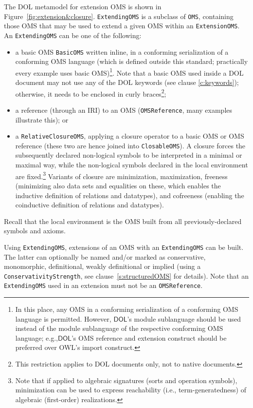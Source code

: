 \documentclass[10pt, a4paper]{isov2}
\makeatletter
\newcommand*{\eg}{e.g.,\@\xspace}
\newcommand*{\syntax}[1]{\texttt{#1}}
\newcommand*{\DOL}{\ensuremath{\mathsf{DOL}}\xspace}
\makeatother
\begin{document}
The DOL metamodel for extension OMS is shown in Figure~\ref{fig:extension&closure}.
\syntax{ExtendingOMS} is a subclass of \syntax{OMS}, containing
those OMS that may be used to extend a given OMS within an \syntax{ExtensionOMS}.
An \syntax{ExtendingOMS} can be one of the following:
\begin{itemize}
\item a basic OMS \syntax{BasicOMS} written inline, in a conforming serialization of a conforming OMS
language (which is defined outside this standard; practically every example uses basic OMS)\footnote{In this place, any OMS in a conforming serialization of a conforming OMS language is permitted.
However, \DOL's module sublanguage should be used instead of the module sublanguage of
the respective conforming OMS language; \eg \DOL's OMS reference and extension construct should be preferred over OWL's import construct.}.
Note that a basic OMS used inside a DOL document may not use any of the DOL
keywords (see clause \ref{c:keywords}); otherwise, it needs to be enclosed in curly braces\footnote{This restriction applies to DOL documents only,
 not to native documents.};
\item a reference (through an IRI) to an OMS (\syntax{OMSReference}, many examples illustrate this); or
\item a \syntax{RelativeClosureOMS}, applying a closure operator to a
  basic OMS or OMS reference (these two are hence joined into
  \syntax{ClosableOMS}). A closure forces the subsequently declared
  non-logical symbols to be interpreted in a minimal  or
  maximal way, while the non-logical symbols declared  in
  the local environment are fixed.\footnote
  {Note that if applied to algebraic signatures (sorts and operation symbols),
    minimization can be used to express reachability (i.e., term-generatedness)
    of algebraic (first-order) realizations.}
  Variants of closure are
  minimization, maximization, freeness (minimizing also data
  sets and equalities on these,  which enables the inductive
  definition of relations and datatypes), and cofreeness (enabling the
  coinductive definition of relations and datatypes).
\end{itemize}
Recall that the local environment is the OMS built from all
previously-declared symbols and axioms.


Using \syntax{ExtendingOMS}, extensions of an OMS with an \syntax{ExtendingOMS}
can be built. The latter can optionally be named and/or marked as conservative, monomorphic, definitional, weakly definitional or implied (using a \syntax{Conser\-va\-tiv\-ityStrength}, see clause~\ref{s:structuredOMS} for details).
Note that an \syntax{ExtendingOMS} used in an extension must
not be an \syntax{OMSReference}.
\end{document}
